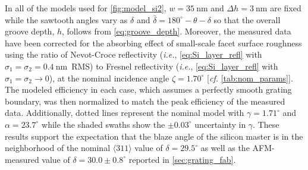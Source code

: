 In all of the models used for \cref{fig:model_si2}, $w = \SI{35}{\nm}$ and $\Delta h = \SI{3}{\nm}$ are fixed while the sawtooth angles vary as $\delta$ and $\bar{\delta} = 180^{\circ} - \theta - \delta$ so that the overall groove depth, $h$, follows from \cref{eq:groove_depth}. 
Moreover, the measured data have been corrected for the absorbing effect of small-scale facet surface roughness using the ratio of Nevot-Croce reflectivity (\emph{i.e.}, \cref{eq:Si_layer_refl} with $\sigma_1 = \sigma_2 = \SI{0.4}{\nm}$~RMS) to Fresnel reflectivity (\emph{i.e.}, \cref{eq:Si_layer_refl} with $\sigma_1 = \sigma_2 \to 0$), at the nominal incidence angle $\zeta = 1.70^{\circ}$ [\emph{cf.\@} \cref{tab:nom_params}]. 
The modeled efficiency in each case, which assumes a perfectly smooth grating boundary, was then normalized to match the peak efficiency of the measured data. 
Additionally, dotted lines represent the nominal model with $\gamma = 1.71^{\circ}$ and $\alpha = 23.7^{\circ}$ while the shaded swaths show the $\pm 0.03^{\circ}$ uncertainty in $\gamma$. 
These results support the expectation that the blaze angle of the silicon master is in the neighborhood of the nominal $\langle 311 \rangle$ value of $\delta = 29.5^{\circ}$ as well as the AFM-measured value of $\delta = 30.0 \pm 0.8^{\circ}$ reported in \cref{sec:grating_fab}. 

